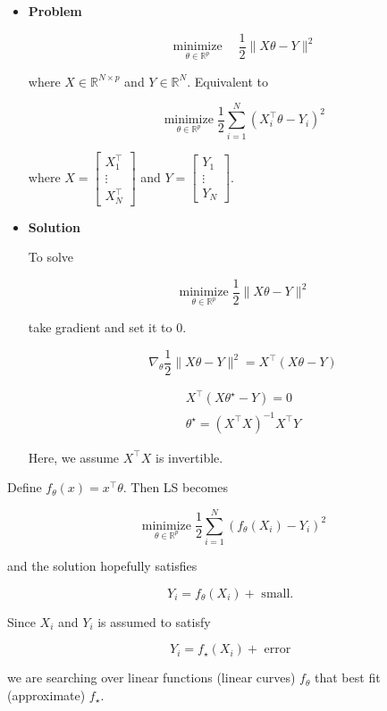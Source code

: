 \documentclass{report}
\begin{document}
\begin{example}
    \begin{itemize}
        \item
        \textbf{Problem}

        $$
        \underset{\theta \in \mathbb{R}^{p}}{\operatorname{minimize}} \quad \frac{1}{2}\|X \theta-Y\|^{2}
        $$

        where $X \in \mathbb{R}^{N \times p}$ and $Y \in \mathbb{R}^{N}$. Equivalent to

        $$
        \underset{\theta \in \mathbb{R}^{p}}{\operatorname{minimize}} \frac{1}{2} \sum_{i=1}^{N}\left(X_{i}^{\top} \theta-Y_{i}\right)^{2}
        $$

        where $X=\left[\begin{array}{c}X_{1}^{\top} \\ \vdots \\ X_{N}^{\top}\end{array}\right]$ and $Y=\left[\begin{array}{c}Y_{1} \\ \vdots \\ Y_{N}\end{array}\right]$.
        \item
        \textbf{Solution}

        To solve

        $$
        \underset{\theta \in \mathbb{R}^{p}}{\operatorname{minimize}} \frac{1}{2}\|X \theta-Y\|^{2}
        $$

        take gradient and set it to $0$.

        $$
        \nabla_{\theta} \frac{1}{2}\|X \theta-Y\|^{2}=X^{\top}(X \theta-Y)
        $$

        $$
        \begin{gathered}
        X^{\top}\left(X \theta^{\star}-Y\right)=0 \\
        \theta^{\star}=\left(X^{\top} X\right)^{-1} X^{\top} Y
        \end{gathered}
        $$

        Here, we assume $X^{\top} X$ is invertible.
    \end{itemize}
\end{example}

\begin{concept}
    Define $f_{\theta}(x)=x^{\top} \theta$.
    Then LS becomes

    $$
    \underset{\theta \in \mathbb{R}^{p}}{\operatorname{minimize}} \frac{1}{2} \sum_{i=1}^{N}\left(f_{\theta}\left(X_{i}\right)-Y_{i}\right)^{2}
    $$

    and the solution hopefully satisfies

    $$
    Y_{i}=f_{\theta}\left(X_{i}\right)+\text { small. }
    $$

    Since $X_{i}$ and $Y_{i}$ is assumed to satisfy

    $$
    Y_{i}=f_{\star}\left(X_{i}\right)+\text { error }
    $$

    we are searching over linear functions (linear curves) $f_{\theta}$ that best fit (approximate) $f_{\star}$.
\end{concept}
\end{document}
